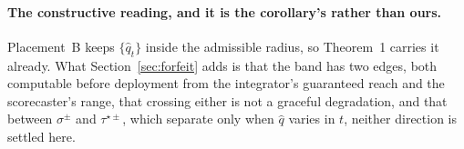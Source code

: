 \paragraph{The constructive reading, and it is the corollary's rather than ours.} Placement~B
keeps $\{\hat{q}_t\}$ inside the admissible radius, so Theorem~1 carries it already. What
Section~\ref{sec:forfeit} adds is that the band has two edges, both computable before deployment
from the integrator's guaranteed reach and the scorecaster's range, that crossing either is not a
graceful degradation, and that between $\sigma^{\pm}$ and $\tau^{\star\pm}$, which separate only
when $\hat{q}$ varies in $t$, neither direction is settled here.

